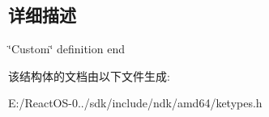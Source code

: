 \subsection{详细描述}
\char`\"{}\+Custom\char`\"{} definition end 

该结构体的文档由以下文件生成\+:\begin{DoxyCompactItemize}
\item 
E\+:/\+React\+O\+S-\/0../sdk/include/ndk/amd64/ketypes.\+h\end{DoxyCompactItemize}
